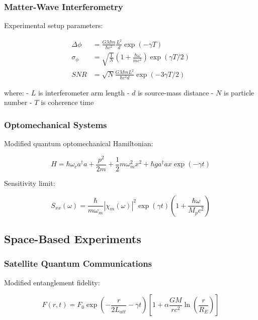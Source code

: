 \documentclass[12pt]{article}
\theoremstyle{plain}
\theoremstyle{definition}
\theoremstyle{remark}
\begin{document}
\subsubsection{Matter-Wave Interferometry}

Experimental setup parameters:

\begin{equation}
\begin{aligned}
\Delta\phi &= \frac{GMm}{\hbar c^2}\frac{L^2}{d}\exp(-\gamma T) \\
\sigma_{\phi} &= \sqrt{\frac{1}{N}}\left(1 + \frac{\hbar\omega}{mc^2}\right)\exp(\gamma T/2) \\
SNR &= \sqrt{N}\frac{GMmL^2}{\hbar c^2d}\exp(-3\gamma T/2)
\end{aligned}
\end{equation}

where:
- $L$ is interferometer arm length
- $d$ is source-mass distance
- $N$ is particle number
- $T$ is coherence time

\subsubsection{Optomechanical Systems}

Modified quantum optomechanical Hamiltonian:

\begin{equation}
H = \hbar\omega_c a^\dagger a + \frac{p^2}{2m} + \frac{1}{2}m\omega_m^2x^2 + \hbar ga^\dagger a x\exp(-\gamma t)
\end{equation}

Sensitivity limit:

\begin{equation}
S_{xx}(\omega) = \frac{\hbar}{m\omega_m}\left|\chi_m(\omega)\right|^2\exp(\gamma t)\left(1 + \frac{\hbar\omega}{M_pc^2}\right)
\end{equation}

\subsection{Space-Based Experiments}

\subsubsection{Satellite Quantum Communications}

Modified entanglement fidelity:

\begin{equation}
F(r,t) = F_0\exp\left(-\frac{r}{2L_{att}} - \gamma t\right)\left[1 + \alpha\frac{GM}{rc^2}\ln\left(\frac{r}{R_E}\right)\right]
\end{equation}
\end{document}
